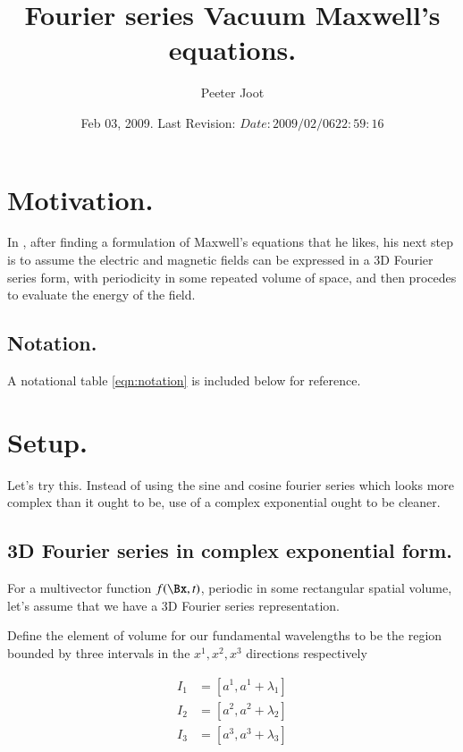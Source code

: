 \documentclass{article}
\title{ Fourier series Vacuum Maxwell's equations. }
\author{Peeter Joot}
\date{ Feb 03, 2009.  Last Revision: $Date: 2009/02/06 22:59:16 $ }
\begin{document}
\maketitle{}

\tableofcontents

\section{ Motivation. }

In \cite{bohm1989qt}, 
after finding a formulation of Maxwell's equations that he likes, his next
step is to assume the electric and magnetic fields can be expressed in 
a 3D Fourier series form, with periodicity in some repeated volume 
of space, and then procedes to evaluate the energy of the 
field.

\subsection{ Notation. }

A notational table 
\ref{eqn:notation}
is included below for reference.

\section{ Setup. }

Let's try this.  Instead of using the sine and cosine fourier series
which looks more complex than it ought to be, use of a complex exponential
ought to be cleaner.

\subsection{ 3D Fourier series in complex exponential form. }

For a multivector function $f(\Bx, t)$, periodic in some rectangular spatial volume, let's assume that we have a
3D Fourier series representation.

Define the element of volume for our fundamental wavelengths to be the region bounded by three intervals in the $x^1, x^2, x^3$ directions respectively

\begin{align*}
I_1 &= [ a^1, a^1 + \lambda_1 ] \\
I_2 &= [ a^2, a^2 + \lambda_2 ] \\
I_3 &= [ a^3, a^3 + \lambda_3 ] \\
\end{align*}
\end{document}
